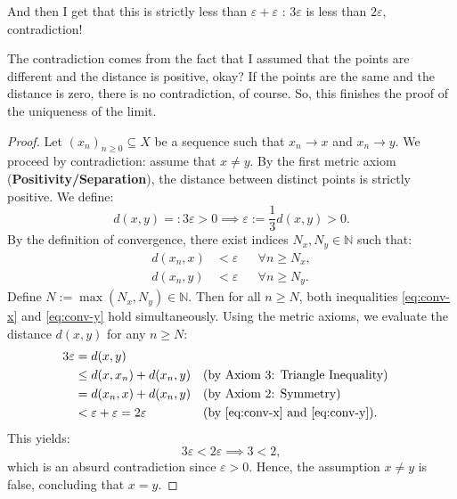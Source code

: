\begin{proofWrapper}
\begin{speech}[00:12:40 - 00:14:15]
And then I get that this is strictly less than $\varepsilon + \varepsilon$ : $3\varepsilon$ is less than $2\varepsilon$, contradiction!

The contradiction comes from the fact that I assumed that the points are different and the distance is positive, okay? If the points are the same and the distance is zero, there is no contradiction, of course. So, this finishes the proof of the uniqueness of the limit. 
\end{speech}

\begin{content}
\begin{proof}
Let $(x_n)_{n \ge 0} \subseteq X$ be a sequence such that $x_n \to x$ and $x_n \to y$.
We proceed by contradiction: assume that $x \neq y$.
By the first metric axiom (\textbf{Positivity/Separation}), the distance between distinct points is strictly positive. We define:
\begin{equation}\label{eq:epsilon-choice}
d(x, y) =: 3\varepsilon > 0 \implies \varepsilon := \frac{1}{3} d(x, y) > 0.
\end{equation}
By the definition of convergence, there exist indices $N_x, N_y \in \mathbb{N}$ such that:
\begin{align}
d(x_n, x) &< \varepsilon && \forall n \ge N_x, \label{eq:conv-x} \\
d(x_n, y) &< \varepsilon && \forall n \ge N_y. \label{eq:conv-y}
\end{align}
Define $N := \max(N_x, N_y) \in \mathbb{N}$. Then for all $n \ge N$, both inequalities \eqref{eq:conv-x} and \eqref{eq:conv-y} hold simultaneously.
Using the metric axioms, we evaluate the distance $d(x, y)$ for any $n \ge N$:
\begin{align}
3\varepsilon &= d(x, y) \nonumber \\
&\le d(x, x_n) + d(x_n, y) && \text{(by Axiom 3: Triangle Inequality)} \nonumber \\
&= d(x_n, x) + d(x_n, y) && \text{(by Axiom 2: Symmetry)} \nonumber \\
&< \varepsilon + \varepsilon = 2\varepsilon && \text{(by \eqref{eq:conv-x} and \eqref{eq:conv-y})}. \label{eq:contradiction-step}
\end{align}
This yields:
\[
3\varepsilon < 2\varepsilon \implies 3 < 2,
\]
which is an absurd contradiction since $\varepsilon > 0$.
Hence, the assumption $x \neq y$ is false, concluding that $x = y$.
\end{proof}
\end{content}

\end{proofWrapper}

